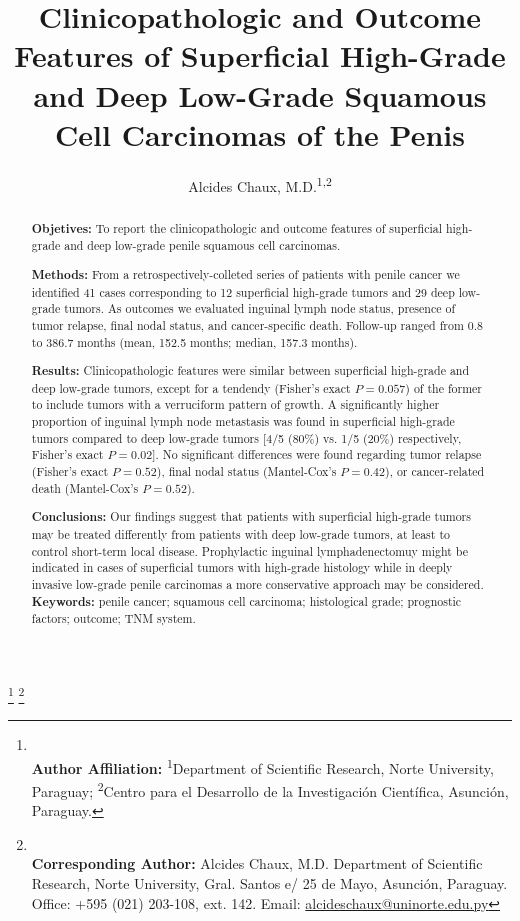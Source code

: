\documentclass[11pt,letterpaper]{article}\usepackage[]{graphicx}\usepackage[]{color}
\title{\textbf{Clinicopathologic and Outcome Features of Superficial High-Grade and Deep Low-Grade Squamous Cell Carcinomas of the Penis}}
\author{Alcides Chaux, M.D.\textsuperscript{1,2}}
\date{}
\begin{document}
\maketitle

\begin{abstract}

\textbf{Objetives:} To report the clinicopathologic and outcome features of superficial high-grade and deep low-grade penile squamous cell carcinomas.

\textbf{Methods:} From a retrospectively-colleted series of patients with penile cancer we identified 41 cases corresponding to 12 superficial high-grade tumors and 29 deep low-grade tumors. As outcomes we evaluated inguinal lymph node status, presence of tumor relapse, final nodal status, and cancer-specific death. Follow-up ranged from 0.8 to 386.7 months (mean, 152.5 months; median, 157.3 months).

\textbf{Results:} Clinicopathologic features were similar between superficial high-grade and deep low-grade tumors, except for a tendendy (Fisher's exact $P=0.057$) of the former to include tumors with a verruciform pattern of growth. A significantly higher proportion of inguinal lymph node metastasis was found in superficial high-grade tumors compared to deep low-grade tumors [4/5 (80\%) vs. 1/5 (20\%) respectively, Fisher's exact $P=0.02$]. No significant differences were found regarding tumor relapse (Fisher's exact $P=0.52$), final nodal status (Mantel-Cox's $P=0.42$), or cancer-related death (Mantel-Cox's $P=0.52$).

\textbf{Conclusions:} Our findings suggest that patients with superficial high-grade tumors may be treated differently from patients with deep low-grade tumors, at least to control short-term local disease. Prophylactic inguinal lymphadenectomuy might be indicated in cases of superficial tumors with high-grade histology while in deeply invasive low-grade penile carcinomas a more conservative approach may be considered.\\

\textbf{Keywords:} penile cancer; squamous cell carcinoma; histological grade; prognostic factors; outcome; TNM system.

\end{abstract}

\let\thefootnote\relax\footnote{
\\ \textbf{Author Affiliation:} \textsuperscript{1}Department of Scientific Research, Norte University, Paraguay; \textsuperscript{2}Centro para el Desarrollo de la Investigación Científica, Asunción, Paraguay.
}
\let\thefootnote\relax\footnote{
\\ \textbf{Corresponding Author:} Alcides Chaux, M.D. Department of Scientific Research, Norte University, Gral. Santos e/ 25 de Mayo, Asunción, Paraguay. Office: +595 (021) 203-108, ext. 142. Email: \href{mailto:alcideschaux@uninorte.edu.py}{alcideschaux@uninorte.edu.py}
}
\end{document}
